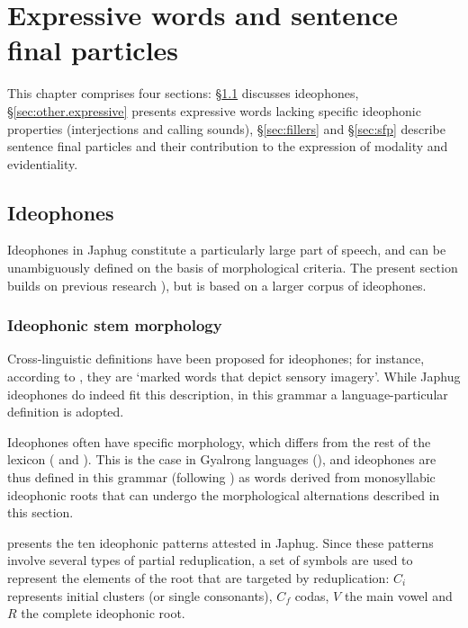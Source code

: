 \chapter{Expressive words and sentence final particles} \label{chap:ideophones.sfp}
This chapter comprises four sections: §\ref{sec:idph} discusses ideophones, §\ref{sec:other.expressive} presents expressive words lacking specific ideophonic properties (interjections and calling sounds), §\ref{sec:fillers} and §\ref{sec:sfp} describe sentence final particles and their contribution to the expression of modality and evidentiality.

\section{Ideophones} \label{sec:idph} 
Ideophones in Japhug constitute a particularly large part of speech, and can be unambiguously defined on the basis of morphological criteria. The present section builds on previous research \citep{jackson04zhuangmaoci, japhug14ideophones}), but is based on a  larger corpus of ideophones.

\subsection{Ideophonic stem morphology} \label{sec:ideo:morpho}
Cross-linguistic definitions have been proposed for ideophones; for instance, according to \citet[2]{dingemanse14}, they are `marked words that depict sensory imagery'.  While  Japhug ideophones do indeed fit this description, in this grammar a language-particular definition is adopted. 

Ideophones often have specific morphology, which differs from the rest of the lexicon (\citealt{diffloth76expressives} and  \citealt{zwicky87expressive}). This is the case in Gyalrong languages (\citealt[3--4]{jackson04zhuangmaoci}), and ideophones are thus defined in this grammar (following \citealt{japhug14ideophones}) as words derived from monosyllabic ideophonic roots that can undergo the morphological alternations described in this section. 

 presents the ten ideophonic patterns attested in Japhug. Since these patterns involve several types of partial reduplication, a set of symbols are used to represent the elements of the root that are targeted by reduplication: $C_i$ represents initial clusters (or single consonants), $C_f$ codas, $V$ the main vowel and $R$ the complete ideophonic root.

